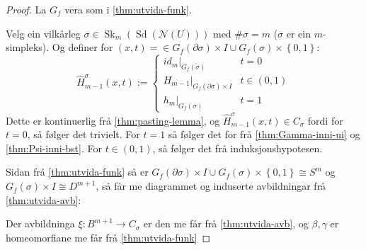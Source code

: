 \documentclass[a4paper, 12pt, norsk]{article}
\theoremstyle{plain}
\theoremstyle{definition}
\newcommand{\Rb}{\mathbb{R}}
\newcommand{\Nc}{\mathcal{N}}
\newcommand{\union}{ \mathop{\cup}\limits }
\newcommand{\gr}[1]{ \lvert #1 \rvert } %
\newcommand{\set}[1]{ \left \{ #1 \right \} } %
\DeclareMathOperator{\Sd}{Sd}
\DeclareMathOperator{\Sk}{Sk}
\begin{document}
\begin{proof}
	La \( G_f \) vera som i \autoref{thm:utvida-funk}.

	Velg ein vilkårleg \( \sigma \in \Sk_m(\Sd(\Nc(U))) \) med \( \#\sigma = m \) (\( \sigma \) er ein \( m \)-simpleks). Og definer for \( (x, t) = \in G_f(\partial\sigma) \times I \union G_f(\sigma) \times \set{0, 1} \): 
	\[
		\hat{H}_{m-1}^\sigma (x,t) := 
		\begin{cases}
			id_m|_{G_f(\sigma)} & t=0 \\
			H_{m-1}|_{G_f(\partial\sigma) \times I} & t \in (0, 1) \\
			h_m|_{G_f(\sigma)} & t=1
		\end{cases}
	\]
	Dette er kontinuerlig frå \autoref{thm:pasting-lemma}, og \( \hat{H}_{m-1}^\sigma (x,t) \in C_\sigma \) fordi for \( t = 0 \), så følger det trivielt. For \( t = 1 \) så følger det for frå \autoref{thm:Gamma-inni-ui} og \autoref{thm:Psi-inni-bst}. For \( t \in (0, 1) \), så følger det frå induksjonshypotesen.

	Sidan frå \autoref{thm:utvida-funk} så er \( G_f(\partial\sigma) \times I \union G_f(\sigma) \times \set{0, 1} \cong S^{m} \) og \( G_f(\sigma) \times I \cong D^{m+1} \), så får me diagrammet og induserte avbildningar frå \autoref{thm:utvida-avb}:


	\begin{center} %
	\end{center}
	Der avbildninga \( \xi: B^{m+1} \to C_\sigma \) er den me får frå \autoref{thm:utvida-avb}, og \( \beta, \gamma \) er homeomorfiane me får frå \autoref{thm:utvida-funk}


\end{proof}
\end{document}
